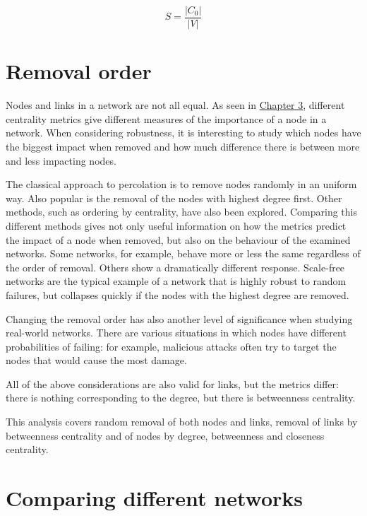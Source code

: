 \documentclass[oneside,openany]{memoir}
\begin{document}
\begin{equation}
S = \frac{|C_0|}{|V|}
\end{equation}

\section{Removal order}\label{removal-order}

Nodes and links in a network are not all equal. As seen in
\hyperref[networkux5ftopologyux5fandux5fgraphs]{Chapter 3}, different
centrality metrics give different measures of the importance of a node
in a network. When considering robustness, it is interesting to study
which nodes have the biggest impact when removed and how much difference
there is between more and less impacting nodes.

The classical approach to percolation is to remove nodes randomly in an
uniform way. Also popular is the removal of the nodes with highest
degree first. Other methods, such as ordering by centrality, have also
been explored. Comparing this different methods gives not only useful
information on how the metrics predict the impact of a node when
removed, but also on the behaviour of the examined networks. Some
networks, for example, behave more or less the same regardless of the
order of removal. Others show a dramatically different response.
Scale-free networks are the typical example of a network that is highly
robust to random failures, but collapses quickly if the nodes with the
highest degree are removed.

Changing the removal order has also another level of significance when
studying real-world networks. There are various situations in which
nodes have different probabilities of failing: for example, malicious
attacks often try to target the nodes that would cause the most damage.

All of the above considerations are also valid for links, but the
metrics differ: there is nothing corresponding to the degree, but there
is betweenness centrality.

This analysis covers random removal of both nodes and links, removal of
links by betweenness centrality and of nodes by degree, betweenness and
closeness centrality.

\section{Comparing different
networks}\label{comparing-different-networks}
\end{document}

